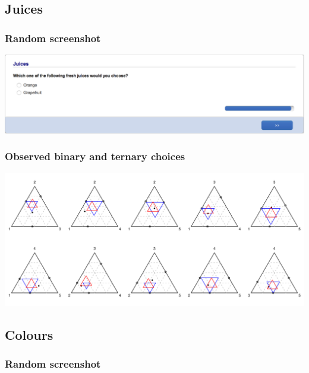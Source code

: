 \documentclass[11pt,letter]{article}
\begin{document}
\pagebreak

\subsection{Juices}



\subsubsection*{Random screenshot}

\includegraphics[width=15cm]{Population_study_design/screenshot_Juices.png}

\subsubsection*{Observed binary and ternary choices}

\includegraphics[width=15cm]{./Population_study_data/Simplexes/Juices.pdf}

\pagebreak

\subsection{Colours}



\subsubsection*{Random screenshot}
\end{document}
